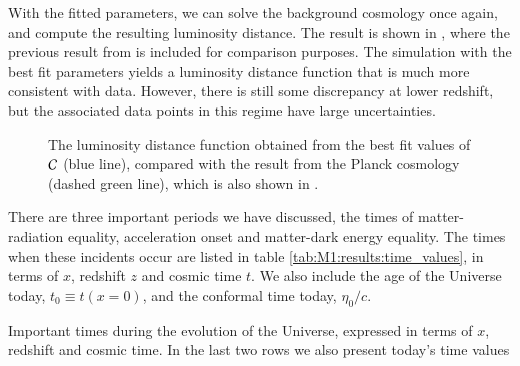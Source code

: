 With the fitted parameters, we can solve the background cosmology once again, and compute the resulting luminosity distance. The result is shown in , where the previous result from  is included for comparison purposes. The simulation with the best fit parameters yields a luminosity distance function that is much more consistent with data. However, there is still some discrepancy at lower redshift, but the associated data points in this regime have large uncertainties.    
\begin{figure}[ht!]
    \caption{The luminosity distance function obtained from the best fit values of $\mathcal{C}$ (blue line), compared with the result from the Planck cosmology (dashed green line), which is also shown in .}
    \label{fig:M1:results:dL_z_compare_fitted}
\end{figure}


There are three important periods we have discussed, the times of matter-radiation equality, acceleration onset and matter-dark energy equality. The times when these incidents occur are listed in table \ref{tab:M1:results:time_values}, in terms of $x$, redshift $z$ and cosmic time $t$. We also include the age of the Universe today, $t_0\equiv t(x=0)$, and the conformal time today, $\eta_0/c$. 
\begin{table*}[ht!]
    \raggedright
    
    \label{tab:M1:results:time_values}
    \caption{Important times during the evolution of the Universe, expressed in terms of $x$, redshift and cosmic time. In the last two rows we also present today's time values}
\end{table*}